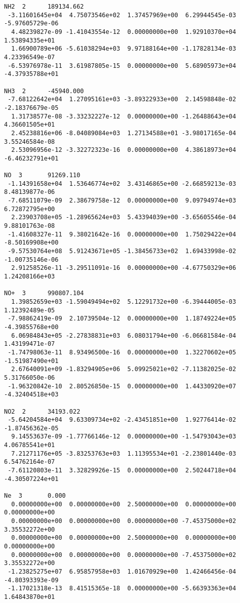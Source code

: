\begin{verbatim}
NH2  2		189134.662						         
 -3.11601645e+04  4.75073546e+02  1.37457969e+00  6.29944545e-03 -5.97605729e-06
  4.48239827e-09 -1.41043554e-12  0.00000000e+00  1.92910370e+04  1.53894335e+01
  1.66900789e+06 -5.61038294e+03  9.97188164e+00 -1.17828134e-03  4.23396549e-07
 -6.53976978e-11  3.61987805e-15  0.00000000e+00  5.68905973e+04 -4.37935788e+01
										 
NH3  2		-45940.000						         
 -7.68122642e+04  1.27095161e+03 -3.89322933e+00  2.14598848e-02 -2.18376679e-05
  1.31738577e-08 -3.33232227e-12  0.00000000e+00 -1.26488643e+04  4.36601505e+01
  2.45238816e+06 -8.04089084e+03  1.27134588e+01 -3.98017165e-04  3.55246584e-08
  2.53096956e-12 -3.32272323e-16  0.00000000e+00  4.38618973e+04 -6.46232791e+01
										 
NO  3		91269.110							 
 -1.14391658e+04  1.53646774e+02  3.43146865e+00 -2.66859213e-03  8.48139877e-06
 -7.68511079e-09  2.38679758e-12  0.00000000e+00  9.09794974e+03  6.72872795e+00
  2.23903708e+05 -1.28965624e+03  5.43394039e+00 -3.65605546e-04  9.88101763e-08
 -1.41608327e-11  9.38021642e-16  0.00000000e+00  1.75029422e+04 -8.50169908e+00
 -9.57530764e+08  5.91243671e+05 -1.38456733e+02  1.69433998e-02 -1.00735146e-06
  2.91258526e-11 -3.29511091e-16  0.00000000e+00 -4.67750329e+06  1.24208166e+03
										 
NO+  3		990807.104						         
  1.39852659e+03 -1.59049494e+02  5.12291732e+00 -6.39444005e-03  1.12392489e-05
 -7.98862419e-09  2.10739504e-12  0.00000000e+00  1.18749224e+05 -4.39855768e+00
  6.06984843e+05 -2.27838831e+03  6.08031794e+00 -6.06681584e-04  1.43199471e-07
 -1.74798063e-11  8.93496500e-16  0.00000000e+00  1.32270602e+05 -1.51987490e+01
  2.67640091e+09 -1.83294905e+06  5.09925021e+02 -7.11382025e-02  5.31766050e-06
 -1.96320842e-10  2.80526850e-15  0.00000000e+00  1.44330920e+07 -4.32404518e+03
										 
NO2  2		34193.022						         
 -5.64204584e+04  9.63309734e+02 -2.43451851e+00  1.92776414e-02 -1.87456362e-05
  9.14553637e-09 -1.77766146e-12  0.00000000e+00 -1.54793043e+03  4.06785541e+01
  7.21271176e+05 -3.83253763e+03  1.11395534e+01 -2.23801440e-03  6.54762164e-07
 -7.61120803e-11  3.32829926e-15  0.00000000e+00  2.50244718e+04 -4.30507224e+01
										 
Ne  3		0.000								 
  0.00000000e+00  0.00000000e+00  2.50000000e+00  0.00000000e+00  0.00000000e+00
  0.00000000e+00  0.00000000e+00  0.00000000e+00 -7.45375000e+02  3.35532272e+00
  0.00000000e+00  0.00000000e+00  2.50000000e+00  0.00000000e+00  0.00000000e+00
  0.00000000e+00  0.00000000e+00  0.00000000e+00 -7.45375000e+02  3.35532272e+00
 -1.23825275e+07  6.95857958e+03  1.01670929e+00  1.42466456e-04 -4.80393393e-09
 -1.17021318e-13  8.41515365e-18  0.00000000e+00 -5.66393363e+04  1.64843870e+01
										 

\end{verbatim}

